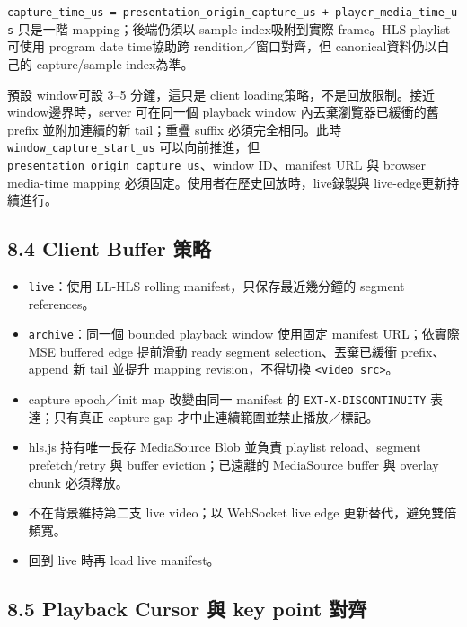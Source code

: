 \documentclass[
  9pt,
  a4paper,
]{article}
\providecommand{\tightlist}{%
  \setlength{\itemsep}{0pt}\setlength{\parskip}{0pt}}
\begin{document}
\texttt{capture\_\allowbreak{}time\_\allowbreak{}us\ =\ presentation\_\allowbreak{}origin\_\allowbreak{}capture\_\allowbreak{}us\ +\ player\_\allowbreak{}media\_\allowbreak{}time\_\allowbreak{}us}
只是一階 mapping；後端仍須以 sample index吸附到實際 frame。HLS
playlist可使用 program date time協助跨 rendition／窗口對齊，但
canonical資料仍以自己的 capture/sample index為準。

預設 window可設 3--5 分鐘，這只是 client loading策略，不是回放限制。接近
window邊界時，server 可在同一個 playback window
內丟棄瀏覽器已緩衝的舊 prefix 並附加連續的新 tail；重疊 suffix
必須完全相同。此時
\texttt{window\_\allowbreak{}capture\_\allowbreak{}start\_\allowbreak{}us}
可以向前推進，但
\texttt{presentation\_\allowbreak{}origin\_\allowbreak{}capture\_\allowbreak{}us}、window
ID、manifest URL 與 browser media-time mapping
必須固定。使用者在歷史回放時，live錄製與 live-edge更新持續進行。

\subsection{8.4 Client Buffer 策略}\label{84-client-buffer-ux7b56ux7565}

\begin{itemize}
\tightlist
\item
  \texttt{live}：使用 LL-HLS rolling manifest，只保存最近幾分鐘的
  segment references。
\item
  \texttt{archive}：同一個 bounded playback window 使用固定 manifest
  URL；依實際 MSE buffered edge 提前滑動 ready segment
  selection、丟棄已緩衝 prefix、append 新 tail 並提升 mapping
  revision，不得切換 \texttt{<video src>}。
\item
  capture epoch／init map 改變由同一 manifest 的
  \texttt{EXT-X-DISCONTINUITY} 表達；只有真正 capture gap 才中止連續範圍並禁止播放／標記。
\item
  hls.js 持有唯一長存 MediaSource Blob 並負責 playlist reload、segment
  prefetch/retry 與 buffer eviction；已遠離的 MediaSource buffer 與 overlay
  chunk 必須釋放。
\item
  不在背景維持第二支 live video；以 WebSocket live edge
  更新替代，避免雙倍頻寬。
\item
  回到 live 時再 load live manifest。
\end{itemize}

\subsection{8.5 Playback Cursor 與 key point
對齊}\label{85-playback-cursor-ux8207-key-point-ux5c0dux9f4a}
\end{document}
